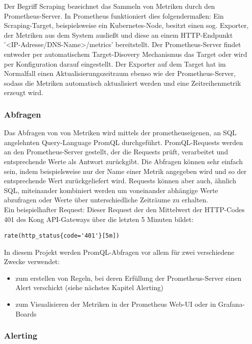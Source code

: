 \documentclass[a4paper,12pt]{scrartcl}
\begin{document}
Der Begriff Scraping bezeichnet das Sammeln von Metriken durch den Prometheus-Server. In Prometheus funktioniert dies folgendermaßen:
Ein Scraping-Target, beispielsweise ein Kubernetes-Node, besitzt einen sog. Exporter, der Metriken aus dem System ausließt und diese an einem HTTP-Endpunkt '<IP-Adresse/DNS-Name>/metrics' bereitstellt. Der Prometheus-Server findet entweder per automatischem Target-Disovery Mechanismus das Target oder wird per Konfiguration darauf eingestellt.
Der Exporter auf dem Target hat im Normalfall einen Aktualisierungszeitraum ebenso wie der Prometheus-Server, sodass die Metriken automatisch aktualisiert werden und eine Zeitreihenmetrik erzeugt wird.

\subsubsection{Abfragen}

Das Abfragen von von Metriken wird mittels der prometheuseigenen, an SQL angelehnten Query-Language PromQL durchgeführt. PromQL-Requests werden an den Prometheus-Server gestellt, der die Requests prüft, verarbeitet und entsprechende Werte als Antwort zurückgibt. Die Abfragen können sehr einfach sein, indem beispielsweise nur der Name einer Metrik angegeben wird und so der entsprechende Wert zurückgeliefert wird. Requests können aber auch, ähnlich SQL, miteinander kombiniert werden um voneinander abhängige Werte abzufragen oder Werte über unterschiedliche Zeiträume zu erhalten.\\

Ein beispielhafter Request:
Dieser Request der den Mittelwert der HTTP-Codes 401 des Kong API-Gateways über die letzten 5 Minuten bildet:
\begin{lstlisting}
rate(http_status{code='401'}[5m])
\end{lstlisting}

In diesem Projekt werden PromQL-Abfragen vor allem für zwei verschiedene Zwecke verwendet:
\begin{itemize}
\item zum erstellen von Regeln, bei deren Erfüllung der Prometheus-Server einen Alert verschickt (siehe nächstes Kapitel Alerting)
\item zum Visualisieren der Metriken in der Prometheus Web-UI oder in Grafana-Boards
\end{itemize}

\subsubsection{Alerting}
\end{document}
